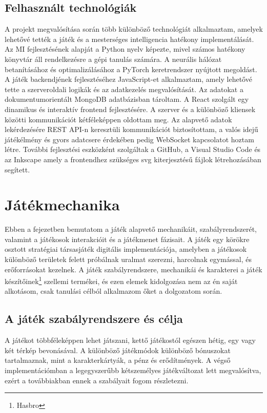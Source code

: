 \documentclass[
]{thesis-ekf}
\theoremstyle{definition}
\theoremstyle{remark}
\begin{document}
\section{Felhasznált technológiák}

A projekt megvalósítása során több különböző technológiát alkalmaztam, amelyek lehetővé tették a játék és a mesterséges intelligencia hatékony implementálását. Az MI fejlesztésének alapját a Python nyelv képezte, mivel számos hatékony könyvtár áll rendelkezésre a gépi tanulás számára. A neurális hálózat betanításához és optimalizálásához a PyTorch keretrendszer nyújtott megoldást. A játék backendjének fejlesztéséhez JavaScript-et alkalmaztam, amely lehetővé tette a szerveroldali logikák és az adatkezelés megvalósítását. Az adatokat a dokumentumorientált MongoDB adatbázisban tároltam. A React szolgált egy dinamikus és interaktív frontend fejlesztésére. A szerver és a különböző kliensek közötti kommunikációt kétféleképpen oldottam meg. Az alapvető adatok lekérdezésére REST API-n keresztüli kommunikációt biztosítottam, a valós idejű játékélmény és gyors adatcsere érdekében pedig WebSocket kapcsolatot hoztam létre. További fejlesztési eszközként szolgáltak a GitHub, a Visual Studio Code és az Inkscape amely a frontendhez szükséges svg kiterjesztésű fájlok létrehozásában segített.

\chapter{Játékmechanika}

Ebben a fejezetben bemutatom a játék alapvető mechanikáit, szabályrendszerét, valamint a játékosok interakcióit és a játékmenet fázisait. A játék egy körökre osztott stratégiai társasjáték digitális implementációja, amelyben a játékosok különböző területek felett próbálnak uralmat szerezni, harcolnak egymással, és erőforrásokat kezelnek. A játék szabályrendszere, mechanikái és karakterei a játék készítőinek\footnote{Hasbro} szellemi termékei, és ezen elemek kidolgozása nem az én saját alkotásom, csak tanulási célból alkalmazom őket a dolgozatom során.

\section{A játék szabályrendszere és célja}

A játékot többféleképpen lehet játszani, kettő játékostól egészen hétig, egy vagy két térkép bevonásával. A különböző játékmódok különböző bónuszokat tartalmaznak, mint a karakterkártyák, a pénz és erődítmények. A végső implementációmban a legegyszerűbb kétszemélyes játékváltozat lett megvalósítva, ezért a továbbiakban ennek a szabályait fogom részletezni. 
\end{document}

